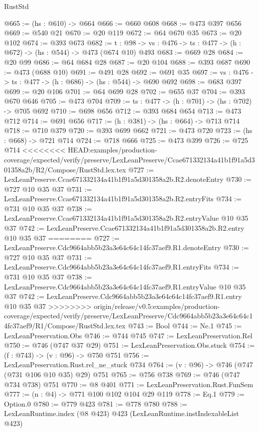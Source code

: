 \begin{lexlean}{RustStd}
\begin{coremodule}
{\begin{coremodule}
@665 := (hs : @610) -> @664
@666 := @660 @608
@668 := @473 @397 @656
@669 := @540 @21
@670 := @20 @119
@672 := @64 @670 @35
@673 := @20 @102
@674 := @393 @673
@682 := {t : @98} -> {vs : @476} -> {ts : @477} -> (h : @672) -> (hs : @544) -> @473 (@674 @10) @493
@683 := @669 @28
@684 := @20 @99
@686 := @64 @684 @28
@687 := @20 @104
@688 := @393 @687
@690 := @473 (@688 @10)
@691 := @491 @28
@692 := @691 @35
@697 := {vs : @476} -> {ts : @477} -> (h : @686) -> (hs : @544) -> @690 @692
@698 := @683 @397
@699 := @20 @106
@701 := @64 @699 @28
@702 := @655 @37
@704 := @393 @670 @646
@705 := @473 @704
@709 := {ts : @477} -> (h : @701) -> (hs : @702) -> @705 @692
@710 := @698 @656
@712 := @393 @684 @654
@713 := @473 @712
@714 := @691 @656
@717 := (h : @381) -> (hs : @664) -> @713 @714
@718 := @710 @379
@720 := @393 @699 @662
@721 := @473 @720
@723 := (hs : @668) -> @721 @714
@724 := @718 @666
@725 := @473 @399
@726 := @725 @714
<<<<<<<< HEAD:examples/production-coverage/expected/verify/preserve/LexLeanPreserve/Ccae671332134a41b1f91a5d301358a2b/R2/Compose/RustStd.lex.tex
@727 := LexLeanPreserve.Ccae671332134a41b1f91a5d301358a2b.R2.denoteEntry
@730 := @727 @10 @35 @37
@731 := LexLeanPreserve.Ccae671332134a41b1f91a5d301358a2b.R2.entryFits
@734 := @731 @10 @35 @37
@738 := LexLeanPreserve.Ccae671332134a41b1f91a5d301358a2b.R2.entryValue @10 @35 @37
@742 := LexLeanPreserve.Ccae671332134a41b1f91a5d301358a2b.R2.entry @10 @35 @37
========
@727 := LexLeanPreserve.Cdc9664abb5b23a3e64c64c14fc37aef9.R1.denoteEntry
@730 := @727 @10 @35 @37
@731 := LexLeanPreserve.Cdc9664abb5b23a3e64c64c14fc37aef9.R1.entryFits
@734 := @731 @10 @35 @37
@738 := LexLeanPreserve.Cdc9664abb5b23a3e64c64c14fc37aef9.R1.entryValue @10 @35 @37
@742 := LexLeanPreserve.Cdc9664abb5b23a3e64c64c14fc37aef9.R1.entry @10 @35 @37
>>>>>>>> origin/release/v0.5:examples/production-coverage/expected/verify/preserve/LexLeanPreserve/Cdc9664abb5b23a3e64c64c14fc37aef9/R1/Compose/RustStd.lex.tex
@743 := Bool
@744 := Ne.{1}
@745 := LexLeanPreservation.Obs
@746 := @744 @745
@747 := LexLeanPreservation.Rel
@750 := @746 (@747 @37 @29)
@751 := LexLeanPreservation.Obs.stuck
@754 := (f : @743) -> (v : @96) -> @750 @751
@756 := LexLeanPreservation.Rust.rel_ne_stuck @734
@764 := (v : @96) -> @746 (@747 (@731 @106 @10 @35) @29) @751
@765 := @756 @738
@769 := @746 (@747 @734 @738) @751
@770 := @8 @401
@771 := LexLeanPreservation.Rust.FunSem
@777 := (n : @4) -> @771 @100 @102 @104 @29 @119
@778 := Eq.{1}
@779 := Option.{0}
@780 := @779 @423
@781 := @778 @780
@788 := LexLeanRuntime.index (@8 @423) @423 (LexLeanRuntime.instIndexableList @423)

\end{coremodule}}
\end{coremodule}
\end{lexlean}
